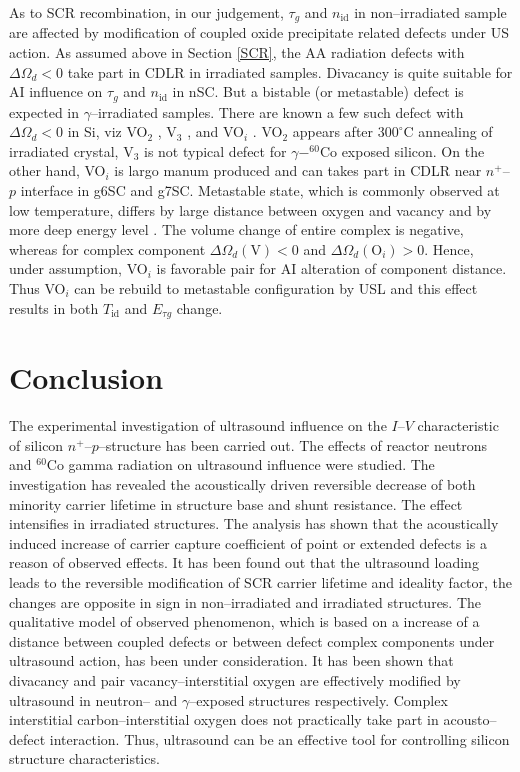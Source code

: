 \documentclass[aip,jap, amsmath,amssymb,reprint]{revtex4-1}
\begin{document}
As to SCR recombination, in our judgement, $\tau_g$ and $n_\mathrm{id}$ in non--irradiated sample
are affected by modification of coupled oxide precipitate related defects under US action.
As assumed above  in Section \ref{SCR},
the AA radiation defects with $\Delta\Omega_d<0$ take part in CDLR in irradiated samples.
Divacancy is quite suitable for AI influence on $\tau_g$ and $n_\mathrm{id}$ in nSC.
But a bistable (or metastable) defect is expected in $\gamma$--irradiated samples.
There are known a few such defect with $\Delta\Omega_d<0$ in Si,
viz VO$_2$ \cite{V2Obistable}, V$_3$ \cite{V3:Markevich}, and VO$_i$ \cite{Bistable:UFN}.
VO$_2$ appears after $300^\circ$C annealing of irradiated crystal,
V$_3$ is not typical defect for $\gamma-^{60}$Co exposed silicon.
On the other hand, VO$_i$ is largo manum produced and can takes part in CDLR near $n^+$--$p$
interface in g6SC and g7SC.
Metastable state, which is commonly observed at low temperature, differs by large distance between oxygen and vacancy and
by  more deep energy level \cite{Bistable:UFN}.
The volume change of entire complex is negative, 
whereas for complex component $\Delta\Omega_d(\mbox{V})<0$ and
$\Delta\Omega_d(\mbox{O}_i)>0$.
Hence, under assumption, VO$_i$ is favorable pair for AI alteration of component distance.
Thus VO$_i$ can be rebuild to metastable configuration by USL and 
this effect results in  both $T_{\mathrm{id}}$ and $E_{\tau g}$ change.



\section{Conclusion}
The experimental investigation of ultrasound influence on the $I$--$V$ characteristic of silicon $n^+$--$p$--structure has been carried out.
The effects of reactor neutrons and $^{60}$Co gamma radiation on ultrasound influence were studied. 
The investigation has revealed the acoustically driven reversible decrease of both minority carrier lifetime in structure base and shunt resistance.
The effect intensifies in irradiated structures.
The analysis has shown that the acoustically induced increase of carrier capture coefficient of point or extended defects is a reason of observed effects.
It has been found out that the ultrasound loading leads to the reversible modification of SCR carrier lifetime and ideality factor,
the changes are opposite in sign in non--irradiated and irradiated structures.
The qualitative model of observed phenomenon, which is based on a increase of a distance between coupled defects or between defect complex components under ultrasound action, has been under consideration.
It has been shown that divacancy and pair vacancy--interstitial oxygen are effectively modified by ultrasound in neutron-- and $\gamma$--exposed structures respectively.
Complex interstitial carbon--interstitial oxygen does not practically take part in acousto--defect interaction.
Thus, ultrasound can be an effective tool for controlling silicon structure characteristics.


\end{document}
